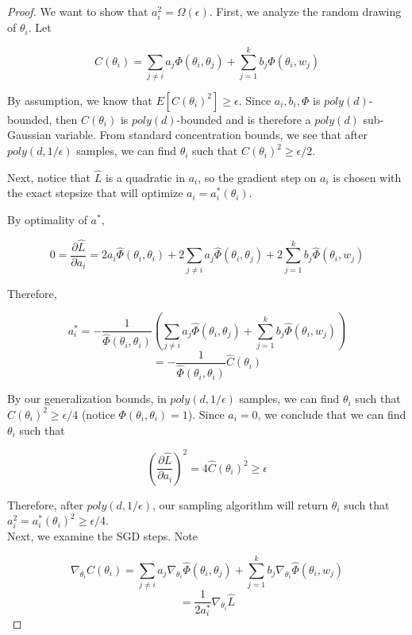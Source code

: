 \documentclass{article}
\newcommand{\pd}[2]{\frac{\partial#1}{\partial#2}}
\begin{document}
\begin{proof}
We want to show that $a_i^2 = \Omega(\epsilon)$. First, we analyze the random drawing of $\theta_i$. Let 

\[  C(\theta_i) = \sum_{j\neq i} a_j \Phi(\theta_i,\theta_j) + \sum_{j=1}^k b_j \Phi(\theta_i,w_j)\]

By assumption, we know that $E[C(\theta_i)^2] \geq \epsilon$. Since $a_i,b_i, \Phi$ is $poly(d)$-bounded, then $C(\theta_i)$ is $poly(d)$-bounded and is therefore a $poly(d)$ sub-Gaussian variable. From standard concentration bounds, we see that after $poly(d,1/\epsilon)$ samples, we can find $\theta_i$ such that $C(\theta_i)^2 \geq \epsilon/2$. 


Next, notice that $\hat{L}$ is a quadratic in $a_i$, so the gradient step on $a_i$ is chosen with the exact stepsize that will optimize $a_i = a_i^*(\theta_i)$. 

By optimality of $a^*$, 

\begin{equation}
0 = \pd{\hat{L}}{a_i} = 2a_i \widehat{\Phi}(\theta_i,\theta_i) + 2\sum_{j\neq i} a_j \widehat{\Phi}(\theta_i,\theta_j) + 2\sum_{j=1}^k b_j \widehat{\Phi}(\theta_i,w_j)
\end{equation} 

Therefore, 

\[ a_i^* = - \frac{1}{\widehat{\Phi}(\theta_i,\theta_i)} (\sum_{j\neq i} a_j \widehat{\Phi}(\theta_i,\theta_j) + \sum_{j=1}^k b_j \widehat{\Phi}(\theta_i,w_j))\]
\[ = -\frac{1}{\widehat{\Phi}(\theta_i,\theta_i)}\widehat{C}(\theta_i) \]


By our generalization bounds, in $poly(d,1/\epsilon)$ samples, we can find $\theta_i$ such that $\widehat{C}(\theta_i)^2 \geq \epsilon/4$ (notice $\Phi(\theta_i,\theta_i) = 1$). Since $a_i = 0$, we conclude that we can find $\theta_i$ such that 

\[(\pd{\hat{L}}{a_i})^2 = 4 \widehat{C}(\theta_i)^2 \geq \epsilon\]

Therefore, after $poly(d,1/\epsilon)$, our sampling algorithm will return $\theta_i$ such that $a_i^2 = a_i^*(\theta_i)^2 \geq \epsilon /4$. \\

Next, we examine the SGD steps. Note

\[\nabla_{\theta_i} \widehat{C}(\theta_i) =  \sum_{j\neq i} a_j \nabla_{\theta_i}\widehat{\Phi}(\theta_i,\theta_j) + \sum_{j=1}^k b_j \nabla_{\theta_i}\widehat{\Phi}(\theta_i,w_j) \]
\[= \frac{1}{2a_i^*} \nabla_{\theta_i}\widehat{L}\]


\end{proof}
\end{document}
